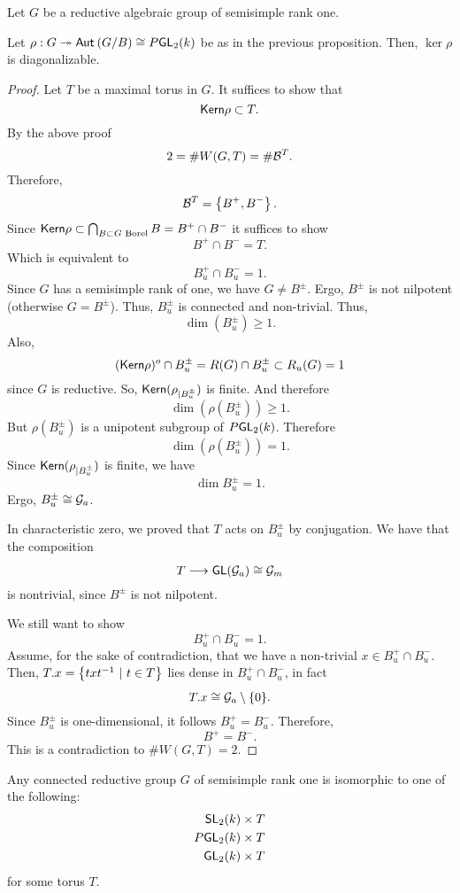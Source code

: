 \begin{proposition}
Let $G$ be a reductive algebraic group of semisimple rank one.

Let $\rho : G \overset{}{\twoheadrightarrow} \textsf{Aut}_{}\left(G/B\right) \overset{}{\cong} P\textsf{GL}_2(k)$ be as in the previous proposition. Then, $\ker \rho$ is diagonalizable.
\end{proposition}
\begin{proof}
	Let $T$ be a maximal torus in $G$. It suffices to show that
	\[ \textsf{Kern} \rho \subset T. \]
	By the above proof
	\[ 2 = \# W(G,T) = \# \mathcal{B}^T. \]
	Therefore,
	\[ \mathcal{B}^T = \left\lbrace B^+, B^- \right\rbrace. \]
	Since $\textsf{Kern} \rho \subset \bigcap_{B \subset G \text{ Borel}} B = B^+ \cap B^-$ it suffices to show
	\[ B^+ \cap B^- = T. \]
	Which is equivalent to
	\[ B_u^+ \cap B_u^- = 1. \]
	Since $G$ has a semisimple rank of one, we have $G \neq B^{\pm}$. Ergo, $B^\pm$ is not nilpotent (otherwise $G = B^\pm$).
	Thus, $B^\pm_u$ is connected and non-trivial. Thus,
	\[ \dim(B^\pm_u) \geq 1. \]
	Also,
	\[ (\textsf{Kern} \rho)^o \cap B_u^\pm = R(G) \cap B_u^\pm \subset R_u(G) = 1 \]
	since $G$ is reductive. So, $\textsf{Kern} (\rho_{|B_u^\pm} )$ is finite. And therefore
	\[ \dim(\rho(B_u^\pm)) \geq 1. \]
	But $\rho(B_u^\pm)$ is a unipotent subgroup of $P \textsf{GL}_2(k)$. Therefore
	\[ \dim(\rho(B_u^\pm)) = 1. \]
	Since $\textsf{Kern} (\rho_{|B_u^\pm} )$ is finite, we have
	\[ \dim B_u^\pm = 1. \]
	Ergo, $B_u^\pm \overset{}{\cong} \mathcal{G}_a$.
	
	In characteristic zero, we proved that $T$ acts on $B_u^{\pm}$ by conjugation. We have that the composition
	\[ T \overset{}{\longrightarrow} \textsf{GL}(\mathcal{G}_a) \overset{}{\cong} \mathcal{G}_m \]
	is nontrivial, since $B^\pm$ is not nilpotent.
	
	We still want to show
	\[ B_u^+ \cap B_u^- = 1. \]
	Assume, for the sake of contradiction, that we have a non-trivial $x \in B_u^+ \cap B_u^-$. Then, $T.x = \left\lbrace txt^{-1} ~ | ~ t \in T\right\rbrace$ lies dense in $B_u^+ \cap B_u^-$, in fact
	\[ T.x \overset{}{\cong} \mathcal{G}_a \setminus \{0\}. \]
	Since $B_u^\pm$ is one-dimensional, it follows $B^+_u = B^-_u$. Therefore,
	\[ B^+ = B^-. \]
	This is a contradiction to $\# W(G,T) = 2$.
\end{proof}
\begin{corollary}
	Any connected reductive group $G$ of semisimple rank one is isomorphic to one of the following:
	\begin{align*}
	\textsf{SL}_2(k) \times T\\
	P\textsf{GL}_2(k) \times T\\
	\textsf{GL}_2(k) \times T
	\end{align*}
	for some torus $T$.
\end{corollary}